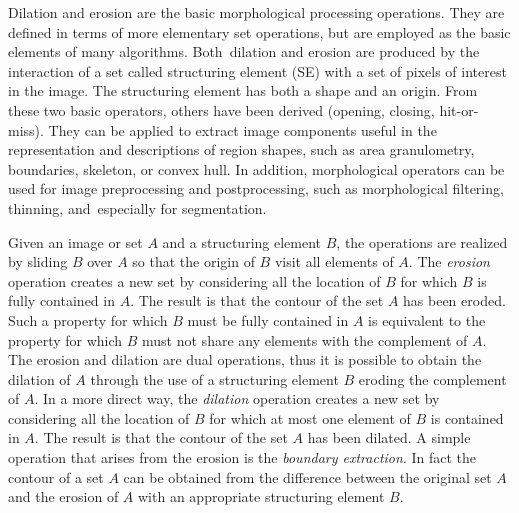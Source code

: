 \documentclass[final,a4paper,12pt,english]{UnicaPhdThesis3}
\begin{document}
Dilation and erosion are the basic morphological processing operations. They are defined in terms of more elementary set operations, but are employed as the basic elements of many algorithms. Both~dilation and erosion are produced by the interaction of a set called structuring element (SE) with a set of pixels of interest in the image. The structuring element has both a shape and an origin. From these two basic operators, others have been derived (opening, closing, hit-or-miss). They can be applied to extract image components useful in the representation and descriptions of region shapes, such as area granulometry, boundaries, skeleton, or convex hull. In addition, morphological operators can be used for image preprocessing and postprocessing, such as morphological filtering, thinning, and~especially for segmentation.

Given an image or set $A$ and a structuring element $B$, the operations are realized by sliding $B$ over $A$ so that the origin of $B$ visit all elements of $A$. The \textit{erosion} operation creates a new set by considering all the location of $B$ for which $B$ is fully contained in $A$. The result is that the contour of the set $A$ has been eroded. Such a property for which $B$ must be fully contained in $A$ is equivalent to the property for which $B$ must not share any elements with the complement of $A$. The erosion and dilation are dual operations, thus it is possible to obtain the dilation of $A$ through the use of a structuring element $B$ eroding the complement of $A$. In a more direct way, the \textit{dilation} operation creates a new set by considering all the location of $B$ for which at most one element of $B$ is contained in $A$. The result is that the contour of the set $A$ has been dilated. A simple operation that arises from the erosion is the \textit{boundary extraction}. In fact the contour of a set $A$ can be obtained from the difference between the original set $A$ and the erosion of $A$ with an appropriate structuring element $B$.
\end{document}
